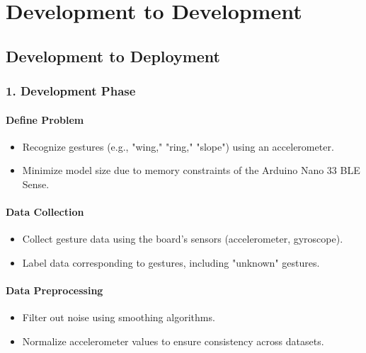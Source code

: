 %
%


\chapter{Development to Development}
\label{chapter 8}

\section{Development to Deployment}

\subsection{1. Development Phase}

\subsubsection{Define Problem}
\begin{itemize}
    \item Recognize gestures (e.g., "wing," "ring," "slope") using an accelerometer.
    \item Minimize model size due to memory constraints of the Arduino Nano 33 BLE Sense.
\end{itemize}

\subsubsection{Data Collection}
\begin{itemize}
    \item Collect gesture data using the board's sensors (accelerometer, gyroscope).
    \item Label data corresponding to gestures, including "unknown" gestures.
\end{itemize}

\subsubsection{Data Preprocessing}
\begin{itemize}
    \item Filter out noise using smoothing algorithms.
    \item Normalize accelerometer values to ensure consistency across datasets.
\end{itemize}

